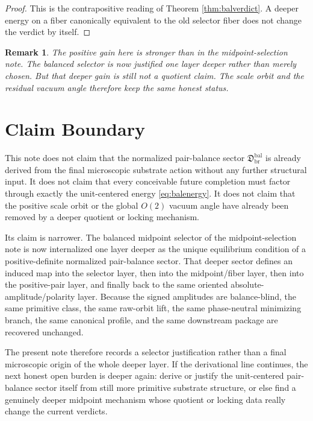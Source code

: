 \documentclass[11pt]{article}
\newcommand{\MidBalanceSector}{\mathfrak D_{\mathrm{br}}^{\mathrm{bal}}}
\newtheorem{remark}{Remark}
\begin{document}
\begin{proof}
This is the contrapositive reading of Theorem \ref{thm:balverdict}. A deeper energy on a fiber canonically equivalent to the old selector fiber does not change the verdict by itself.
\end{proof}

\begin{remark}
The positive gain here is stronger than in the midpoint-selection note. The balanced selector is now justified one layer deeper rather than merely chosen. But that deeper gain is still not a quotient claim. The scale orbit and the residual vacuum angle therefore keep the same honest status.
\end{remark}

\section{Claim Boundary}

This note does not claim that the normalized pair-balance sector \(\MidBalanceSector\) is already derived from the final microscopic substrate action without any further structural input. It does not claim that every conceivable future completion must factor through exactly the unit-centered energy \eqref{eq:balenergy}. It does not claim that the positive scale orbit or the global \(O(2)\) vacuum angle have already been removed by a deeper quotient or locking mechanism.

Its claim is narrower. The balanced midpoint selector of the midpoint-selection note is now internalized one layer deeper as the unique equilibrium condition of a positive-definite normalized pair-balance sector. That deeper sector defines an induced map into the selector layer, then into the midpoint/fiber layer, then into the positive-pair layer, and finally back to the same oriented absolute-amplitude/polarity layer. Because the signed amplitudes are balance-blind, the same primitive class, the same raw-orbit lift, the same phase-neutral minimizing branch, the same canonical profile, and the same downstream package are recovered unchanged.

The present note therefore records a selector justification rather than a final microscopic origin of the whole deeper layer. If the derivational line continues, the next honest open burden is deeper again: derive or justify the unit-centered pair-balance sector itself from still more primitive substrate structure, or else find a genuinely deeper midpoint mechanism whose quotient or locking data really change the current verdicts.
\end{document}
